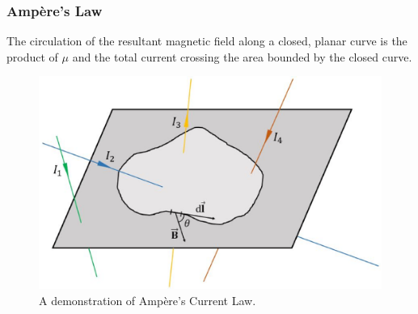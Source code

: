 \documentclass{scrartcl}
\begin{document}
    \subsubsection{Amp\`ere's Law}\newline
    The circulation of the resultant magnetic field along a closed, planar curve is the product of $\mu$ and the total current crossing the area bounded by the closed curve.
    \begin{figure}[H]
        \centering
        \includegraphics[scale=.45]{ampere.eps}
        \caption{A demonstration of Amp\`ere's Current Law.}
    \end{figure}
\end{document}
